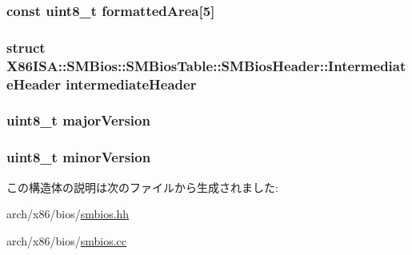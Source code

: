 \hypertarget{structX86ISA_1_1SMBios_1_1SMBiosTable_1_1SMBiosHeader_a091d93ca428b67eea1367ee9822c0d4d}{
\subsubsection[{formattedArea}]{\setlength{\rightskip}{0pt plus 5cm}const uint8\_\-t {\bf formattedArea}\mbox{[}5\mbox{]}}}
\label{structX86ISA_1_1SMBios_1_1SMBiosTable_1_1SMBiosHeader_a091d93ca428b67eea1367ee9822c0d4d}
\hypertarget{structX86ISA_1_1SMBios_1_1SMBiosTable_1_1SMBiosHeader_acd80f257832972df7c3574d0751fa3d3}{
\subsubsection[{intermediateHeader}]{\setlength{\rightskip}{0pt plus 5cm}struct {\bf X86ISA::SMBios::SMBiosTable::SMBiosHeader::IntermediateHeader}  {\bf intermediateHeader}}}
\label{structX86ISA_1_1SMBios_1_1SMBiosTable_1_1SMBiosHeader_acd80f257832972df7c3574d0751fa3d3}
\hypertarget{structX86ISA_1_1SMBios_1_1SMBiosTable_1_1SMBiosHeader_a8842006928b763da7c334d250ee3d2fa}{
\subsubsection[{majorVersion}]{\setlength{\rightskip}{0pt plus 5cm}uint8\_\-t {\bf majorVersion}}}
\label{structX86ISA_1_1SMBios_1_1SMBiosTable_1_1SMBiosHeader_a8842006928b763da7c334d250ee3d2fa}
\hypertarget{structX86ISA_1_1SMBios_1_1SMBiosTable_1_1SMBiosHeader_a5226152cf60d80852dfdbc094a8e4eb6}{
\subsubsection[{minorVersion}]{\setlength{\rightskip}{0pt plus 5cm}uint8\_\-t {\bf minorVersion}}}
\label{structX86ISA_1_1SMBios_1_1SMBiosTable_1_1SMBiosHeader_a5226152cf60d80852dfdbc094a8e4eb6}


この構造体の説明は次のファイルから生成されました:\begin{DoxyCompactItemize}
\item 
arch/x86/bios/\hyperlink{smbios_8hh}{smbios.hh}\item 
arch/x86/bios/\hyperlink{smbios_8cc}{smbios.cc}\end{DoxyCompactItemize}
